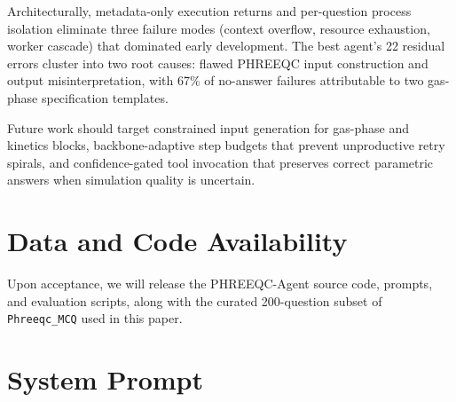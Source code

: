 \documentclass[sigconf,anonymous]{acmart}
\begin{document}
Architecturally, metadata-only execution returns and per-question
process isolation eliminate three failure modes (context overflow,
resource exhaustion, worker cascade) that dominated early development.
The best agent's 22 residual errors cluster into two root causes:
flawed PHREEQC input construction and output misinterpretation, with
67\% of no-answer failures attributable to two gas-phase specification
templates.

Future work should target constrained input generation for gas-phase
and kinetics blocks, backbone-adaptive step budgets that prevent
unproductive retry spirals, and confidence-gated tool invocation that
preserves correct parametric answers when simulation quality is uncertain.

\section{Data and Code Availability}
Upon acceptance, we will release the PHREEQC-Agent source code, prompts, and evaluation scripts, along with the curated 200-question subset of \texttt{Phreeqc\_MCQ} used in this paper.




\newpage
\appendix
{}
\section{System Prompt}
\label{app:system_prompt}
\end{document}
